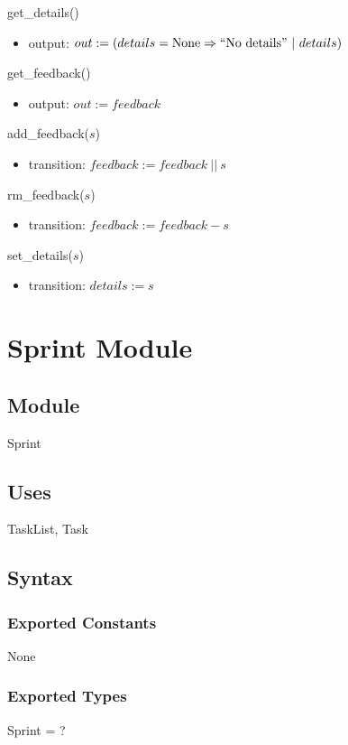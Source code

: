 \documentclass[12pt, titlepage]{article}
\begin{document}
\noindent get\_details()
\begin{itemize}
    \item output: $out := (details = \text{None} \Rightarrow ``\text{No details}"\ |\ details)$
\end{itemize}

\noindent get\_feedback()
\begin{itemize}
    \item output: $out := feedback$
\end{itemize}

\noindent add\_feedback($s$)
\begin{itemize}
    \item transition: $feedback := feedback\ ||\ s$
\end{itemize}
\newpage

\noindent rm\_feedback($s$)
\begin{itemize}
    \item transition: $feedback := feedback - s$
\end{itemize}

\noindent set\_details($s$)
\begin{itemize}
    \item transition: $details := s$
\end{itemize}

\newpage

\section* {Sprint Module}

\subsection*{Module}
Sprint

\subsection* {Uses}
TaskList, Task 

\subsection* {Syntax}
\subsubsection* {Exported Constants}
None

\subsubsection* {Exported Types}
Sprint = ?
\end{document}
